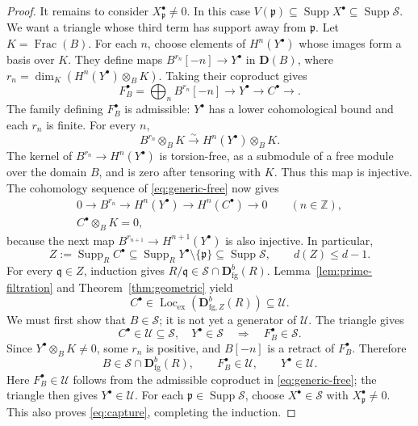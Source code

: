 \documentclass[11pt]{amsart}
\numberwithin{equation}{section}
\theoremstyle{definition}
\theoremstyle{remark}
\DeclareMathOperator{\Supp}{Supp}
\DeclareMathOperator{\Loc}{Loc}
\DeclareMathOperator{\Frac}{Frac}
\newcommand{\D}{\mathbf D}
\newcommand{\fg}{\mathrm{fg}}
\newcommand{\Lex}{\Loc_{\mathrm{ex}}}
\newcommand{\p}{\mathfrak p}
\newcommand{\q}{\mathfrak q}
\begin{document}
\begin{proof}
It remains to consider $X_\p^{\bullet}\ne0$. In this case
$V(\p)\subseteq\Supp X^{\bullet}\subseteq\Supp\mathcal S$.
We want a triangle whose third term has support away from $\p$.
Let $K=\Frac(B)$. For each $n$, choose elements of $H^n(Y^{\bullet})$
whose images form a basis over $K$. They define maps
$B^{r_n}[-n]\to Y^{\bullet}$ in $\D(B)$, where
$r_n=\dim_K(H^n(Y^{\bullet})\otimes_BK)$. Taking their coproduct gives
\begin{equation}\label{eq:generic-free}
 F_B^{\bullet}=\bigoplus_nB^{r_n}[-n]\longrightarrow Y^{\bullet}\longrightarrow C^{\bullet}\longrightarrow.
\end{equation}
The family defining $F_B^\bullet$ is admissible: $Y^\bullet$ has a
lower cohomological bound and each $r_n$ is finite. For every $n$,
\[
 B^{r_n}\otimes_BK\xrightarrow{\sim}H^n(Y^\bullet)\otimes_BK.
\]
The kernel of $B^{r_n}\to H^n(Y^\bullet)$ is torsion-free, as a
submodule of a free module over the domain $B$, and is zero after
tensoring with $K$. Thus this map is injective. The cohomology
sequence of \eqref{eq:generic-free} now gives
\begin{equation}\label{eq:torsion-cone}
\begin{gathered}
 0\longrightarrow B^{r_n}\longrightarrow H^n(Y^\bullet)
    \longrightarrow H^n(C^\bullet)\longrightarrow0
 \qquad(n\in\mathbb Z),\\
 C^\bullet\otimes_BK=0,
\end{gathered}
\end{equation}
because the next map $B^{r_{n+1}}\to H^{n+1}(Y^\bullet)$ is also
injective. In particular,
\[
 Z:=\Supp_R C^\bullet
    \subseteq\Supp_RY^\bullet\setminus\{\p\}
    \subseteq\Supp\mathcal S,\qquad d(Z)\le d-1.
\]
For every $\q\in Z$, induction gives $R/\q\in
\mathcal S\cap\D^b_{\fg}(R)$. Lemma~\ref{lem:prime-filtration} and
Theorem~\ref{thm:geometric} yield
\[
 C^\bullet\in\Lex(\D^b_{\fg,Z}(R))\subseteq\mathcal U.
\]
We must first show that $B\in\mathcal S$; it is not yet a generator
of $\mathcal U$. The triangle gives
\[
 C^\bullet\in\mathcal U\subseteq\mathcal S,\quad
 Y^\bullet\in\mathcal S
 \quad\Longrightarrow\quad F_B^\bullet\in\mathcal S.
\]
Since $Y^\bullet\otimes_BK\ne0$, some $r_n$ is positive, and
$B[-n]$ is a retract of $F_B^\bullet$. Therefore
\[
 B\in\mathcal S\cap\D^b_{\fg}(R),\qquad
 F_B^\bullet\in\mathcal U,\qquad Y^\bullet\in\mathcal U.
\]
Here $F_B^\bullet\in\mathcal U$ follows from the admissible coproduct
in \eqref{eq:generic-free}; the triangle then gives
$Y^\bullet\in\mathcal U$. For each $\p\in\Supp\mathcal S$, choose
$X^{\bullet}\in\mathcal S$ with $X_\p^{\bullet}\ne0$. This also proves
\eqref{eq:capture}, completing the induction.
\end{proof}
\end{document}
